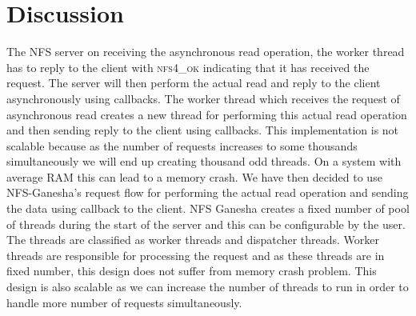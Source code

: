 \section{Discussion}

	The NFS server on receiving the asynchronous read operation, the worker thread has to reply to the client with \textsc{nfs4\_ok} indicating that it has received the request. The server will then perform the actual read and reply to the client asynchronously using callbacks. The worker thread which receives the request of asynchronous read creates a new thread for performing this actual read operation and then sending reply to the client using callbacks. This implementation is not scalable because as the number of requests increases to some thousands simultaneously we will end up creating thousand odd threads. On a system with average RAM this can lead to a memory crash. We have then decided to use NFS-Ganesha's request flow for performing the actual read operation and sending the data using callback to the client. NFS Ganesha creates a fixed number of pool of threads during the start of the server and this can be configurable by the user. The threads are classified as worker threads and dispatcher threads. Worker threads are responsible for processing the request  and as these threads are in fixed number, this design does not suffer from memory crash problem. This design is also scalable as we can increase the number of threads to run in order to handle more number of requests simultaneously. 